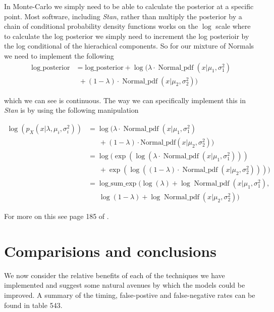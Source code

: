 \documentclass[11pt]{report}
\begin{document}
In Monte-Carlo we simply need to be able to calculate the posterior at a specific point. Most software, including \emph{Stan}, rather than multiply the posterior by a chain of conditional probability density functions works on the $\log$ scale where to calculate the log posterior we simply need to increment the log posterioir by the log conditional of the hierachical components. So for our mixture of Normals we need to implement the following
\begin{align}
  \text{log\_posterior} &= \text{log\_posterior} + \log(\lambda \cdot \operatorname{Normal\_pdf}(x | \mu_1, \sigma_1^2)  \nonumber \\
                   & \ \ + (1 - \lambda) \cdot \operatorname{Normal\_pdf}(x | \mu_2, \sigma_2^2))
\end{align}

which we can see is continuous. The way we can specifically implement this in \emph{Stan} is by using the following manipulation

\begin{align}
\log(p_X(x | \lambda, \mu_i, \sigma^2_i)) &= \log(\lambda \cdot \operatorname{Normal\_pdf}(x | \mu_1, \sigma_1^2)  \nonumber \\
& \ \ \ \ \ \ \ + (1 - \lambda) \cdot \text{Normal\_pdf}(x | \mu_2, \sigma_2^2)) \\
&= \log(\exp(\log(\lambda \cdot \operatorname{Normal\_pdf}(x | \mu_1, \sigma_1^2)))  \nonumber \\
& \ \ \ \ \ \ \ + \exp(\log((1 - \lambda) \cdot \operatorname{Normal\_pdf}(x | \mu_2, \sigma_2^2)))) \\
&= \operatorname{log\_sum\_exp}(\log(\lambda) + \log\operatorname{Normal\_pdf}(x | \mu_1, \sigma_1^2),  \nonumber \\
& \ \ \ \ \ \ \ \log(1 - \lambda) + \log\operatorname{Normal\_pdf}(x | \mu_2, \sigma_2^2))
\end{align} 

For more on this see page 185 of \cite{stan}.

\chapter{Comparisions and conclusions}

We now consider the relative benefits of each of the techniques we have implemented and suggest some natural avenues by which the models could be improved. A summary of the timing, false-postive and false-negative rates can be found in table 543. \\
\end{document}
